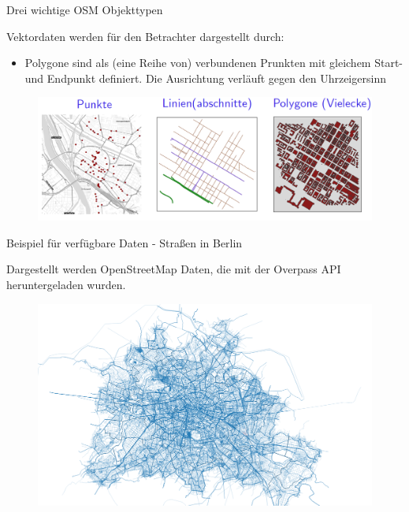 \documentclass[ignorenonframetext,]{beamer}
\providecommand{\tightlist}{%
  \setlength{\itemsep}{0pt}\setlength{\parskip}{0pt}}
\begin{document}
\begin{frame}{Drei wichtige OSM Objekttypen}

\begin{block}{Vektordaten werden für den Betrachter dargestellt durch:}

\begin{itemize}
\tightlist
\item
  Polygone sind als (eine Reihe von) verbundenen Prunkten mit gleichem
  Start- und Endpunkt definiert. Die Ausrichtung verläuft gegen den
  Uhrzeigersinn
\end{itemize}

\begin{figure}
\centering
\includegraphics{figure/DreiObjektTypen.PNG}
\caption{}
\end{figure}

\end{block}

\end{frame}

\begin{frame}{Beispiel für verfügbare Daten - Straßen in Berlin}

Dargestellt werden OpenStreetMap Daten, die mit der Overpass API
heruntergeladen wurden.

\begin{figure}
\centering
\includegraphics{figure/streets_Berlin2.png}
\caption{}
\end{figure}

\end{frame}
\end{document}
